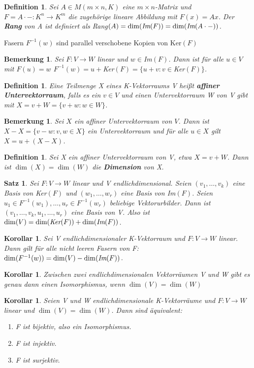 \documentclass[12pt,a4paper]{article}
\theoremstyle{plain}
\newtheorem{Satz}[Theorem]{Satz}
\newtheorem{Korollar}[Theorem]{Korollar}
\newtheorem{Definition}[Theorem]{Definition}
\newtheorem{Bemerkung}[Theorem]{Bemerkung}
\newcommand{\herv}[1]{{\emph{\textbf{#1}}}}
\numberwithin{equation}{section}
\begin{document}
\begin{Definition}
Sei $A\in M(m\times n, K)$ eine $m\times n$-Matrix und $F=A\cdot -: K^n\rightarrow K^m$ die zugehörige lineare Abbildung mit $F(x)=A x$. Der \herv{Rang} von A ist definiert als \emph{Rang}$(A)=\dim(\emph{Im}(F))=\dim(\emph{Im}(A\cdot -))$.
\end{Definition}
\glqq Fasern $F^{-1}(w)$ sind parallel verschobene Kopien von Ker$(F)$\grqq
\begin{Bemerkung}
Sei $F:V\rightarrow W$ linear und $w\in$Im$(F)$. Dann ist für alle $u \in V$ mit $F(u)=w$ $F^{-1}(w)=u+$Ker$(F)=\{u+v: v \in $Ker$(F)\}$.
\end{Bemerkung}
\begin{Definition}
Eine Teilmenge X eines K-Vektorraums V heißt \herv{affiner Untervektorraum}, falls es ein $v\in V$ und einen Untervektorraum W von V gibt mit $X=v+W=\{v+w: w\in W\}$.
\end{Definition}
\begin{Bemerkung}
Sei $X$ ein affiner Untervektorraum von $V$. Dann ist $X-X=\{v-w: v,w\in X\}$ ein Untervektorraum und für alle $u\in X$ gilt $X=u+(X-X)$.
\end{Bemerkung}
\begin{Definition}
Sei X ein affiner Untervektorraum von V, etwa $X=v+W$. Dann ist $\dim(X)=\dim(W)$ die \herv{Dimension} von X.
\end{Definition}
\begin{Satz}
Sei $F: V \rightarrow W$ linear und V endlichdimensional. Seien $(v_1,\ldots,v_k)$ eine Basis von \emph{Ker}$(F)$ und $(w_1,\ldots,w_r)$ eine Basis von \emph{Im}$(F)$. Seien $u_1\in F^{-1}(w_1),\ldots,u_r\in F^{-1}(w_r)$ beliebige Vektorurbilder. Dann ist $(v_1,\ldots,v_k,u_1,\ldots,u_r)$ eine Basis von V. Also ist $\dim(V)=\dim(\emph{Ker}(F))+\dim(\emph{Im}(F))$.
\end{Satz}
\begin{Korollar}
Sei V endlichdimensionaler K-Vektorraum und $F:V\rightarrow W$ linear. Dann gilt für alle nicht leeren Fasern von F: $\dim(F^{-1}(w))=\dim(V)-\dim(\emph{Im}(F))$.
\end{Korollar}
\begin{Korollar}
Zwischen zwei endlichdimensionalen Vektorräumen V und W gibt es genau dann einen Isomorphismus, wenn $\dim(V)=\dim(W)$
\end{Korollar}
\begin{Korollar}
Seien V und W endlichdimensionale K-Vektorräume und $F: V\rightarrow W$ linear und $\dim(V)=\dim(W)$. Dann sind äquivalent:
\begin{enumerate}
\renewcommand{\labelenumi}{\emph{(\roman{enumi})}}
\item F ist bijektiv, also ein Isomorphismus.
\item F ist injektiv.
\item F ist surjektiv.
\end{enumerate}
\end{Korollar}
\end{document}
